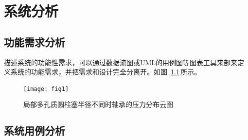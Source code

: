 

\chapter{系统分析}

\section{功能需求分析}
描述系统的功能性需求，可以通过数据流图或UML的用例图等图表工具来部来定义系统的功能需求，并把需求和设计完全分离开。如图~\ref{fig:single}\,所示。




\begin{figure}[H]
	\centering 
	\texttt{[image: fig1]} 
	\caption{局部多孔质圆柱塞半径不同时轴承的压力分布云图}
	\label{fig:single}
\end{figure}






\section{系统用例分析}

